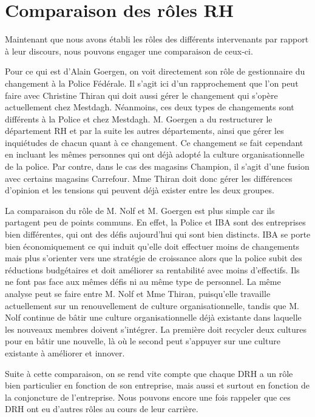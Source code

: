 \section{Comparaison des rôles RH}

Maintenant que nous avons établi les rôles des différents intervenants par rapport à leur discours, nous pouvons engager une comparaison de ceux-ci. \newline


Pour ce qui est d'Alain Goergen, on voit directement son rôle de gestionnaire du changement à la Police Fédérale. Il s'agit ici d'un rapprochement que l'on peut faire avec Christine Thiran qui doit aussi gérer le changement qui s'opère actuellement chez Mestdagh. Néanmoins, ces deux types de changements sont différents à la Police et chez Mestdagh. M. Goergen a du restructurer le département RH et par la suite les autres départements, ainsi que gérer les inquiétudes de chacun quant à ce changement. Ce changement se fait cependant en incluant les mêmes personnes qui ont déjà adopté la culture organisationnelle de la police. Par contre, dans le cas des magasins Champion, il s'agit d'une fusion avec certains magasins Carrefour. Mme Thiran doit donc gérer les différences d'opinion et les tensions qui peuvent déjà exister entre les deux groupes.\newline
{}

La comparaison du rôle de M. Nolf et M. Goergen est plus simple car ils partagent peu de points communs. En effet, la Police et IBA sont des entreprises bien différentes, qui ont des défis aujourd'hui qui sont bien distincts. IBA se porte bien économiquement ce qui induit qu'elle doit effectuer moins de changements mais plus s'orienter vers une stratégie de croissance alors que la police subit des réductions budgétaires et doit améliorer sa rentabilité avec moins d'effectifs. Ils ne font pas face aux mêmes défis ni au même type de personnel. La même analyse peut se faire entre M. Nolf et Mme Thiran, puisqu'elle travaille actuellement sur un renouvellement de culture organisationnelle, tandis que M. Nolf continue de bâtir une culture organisationnelle déjà existante dans laquelle les nouveaux membres doivent s'intégrer. La première doit recycler deux cultures pour en bâtir une nouvelle, là où le second peut s'appuyer sur une culture existante à améliorer et innover.


Suite à cette comparaison, on se rend vite compte que chaque DRH a un rôle bien particulier en fonction de son entreprise, mais aussi et surtout en fonction de la conjoncture de l'entreprise. Nous pouvons encore une fois rappeler que ces DRH ont eu d'autres rôles au cours de leur carrière. 
